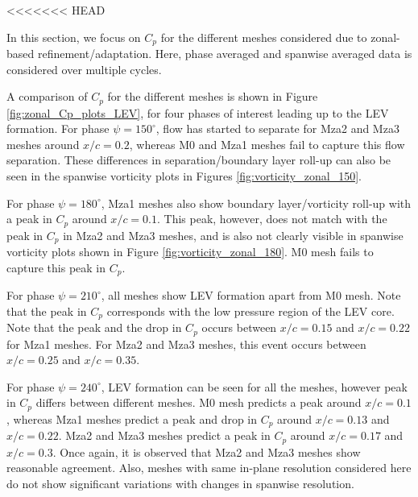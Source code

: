 <<<<<<< HEAD

In this section, we focus on $C_p$ for the different meshes considered due to zonal-based refinement/adaptation. Here, phase averaged and spanwise averaged data is considered over multiple cycles.

A comparison of $C_p$ for the different meshes is shown in Figure \ref{fig:zonal_Cp_plots_LEV}, for four phases of interest leading up to the LEV formation. For phase $\psi=150^\circ$, flow has started to separate for Mza2 and Mza3 meshes around $x/c = 0.2$, whereas M0 and Mza1 meshes fail to capture this flow separation. These differences in separation/boundary layer roll-up can also be seen in the spanwise vorticity plots in Figures \ref{fig:vorticity_zonal_150}.

For phase $\psi=180^\circ$, Mza1 meshes also show boundary layer/vorticity roll-up with a peak in $C_p$ around $x/c = 0.1$. This peak, however, does not match with the peak in $C_p$ in Mza2 and Mza3 meshes, and is also not clearly visible in spanwise vorticity plots shown in Figure \ref{fig:vorticity_zonal_180}. M0 mesh fails to capture this peak in $C_p$. 


For phase $\psi=210^\circ$, all meshes show LEV formation apart from M0 mesh. Note that the peak in $C_p$ corresponds with the low pressure region of the LEV core. Note that the peak and the drop in $C_p$ occurs between $x/c=0.15$ and $x/c=0.22$ for Mza1 meshes. For Mza2 and Mza3 meshes, this event occurs between $x/c=0.25$ and $x/c=0.35$.

For phase $\psi=240^\circ$, LEV formation can be seen for all the meshes, however peak in $C_p$ differs between different meshes. M0 mesh predicts a peak around $x/c=0.1$, whereas Mza1 meshes predict a peak and drop in $C_p$ around $x/c=0.13$ and $x/c=0.22$. Mza2 and Mza3 meshes predict a peak in $C_p$ around $x/c=0.17$ and $x/c=0.3$. Once again, it is observed that Mza2 and Mza3 meshes show reasonable agreement. Also, meshes with same in-plane resolution considered here do not show significant variations with changes in spanwise resolution.




